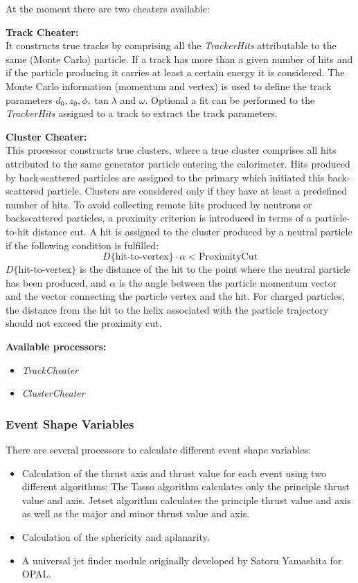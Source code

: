 At the moment there are two cheaters available:

{\bf Track Cheater:} \\
It constructs true tracks by comprising all the {\em TrackerHits} attributable
to the same (Monte Carlo) particle. If a track has more than a given number of
hits and if the particle producing it carries at least a certain 
energy it is considered. The Monte Carlo information 
(momentum and vertex) is used to define the track parameters
$d_0, z_0, \phi, \tan\lambda$ and $\omega$.
Optional a fit can be performed to the {\em TrackerHits} assigned to a track
to extract the track parameters. 

{\bf Cluster Cheater:} \\
This processor constructs true clusters, where a true cluster comprises all 
hits attributed to the same generator particle entering 
the calorimeter. Hits produced by back-scattered particles are assigned to the 
primary which initiated this back-scattered particle. 
Clusters are considered only if they have at least a predefined number of 
hits. 
To avoid collecting remote hits produced by neutrons or backscattered 
particles, a proximity criterion is introduced in terms 
of a particle-to-hit distance cut. A hit is assigned to the cluster 
produced by a neutral particle if 
the following condition is fulfilled: 
$$
D\{\textrm{hit-to-vertex}\} \cdot \alpha < \textrm{ProximityCut}
$$
$D\{$hit-to-vertex$\}$ is the distance of the hit to the point 
where the neutral particle has been produced, and $\alpha$ is the 
angle between the particle momentum vector and the vector connecting 
the particle vertex and the hit. 
For charged particles, the distance from the hit to 
the helix associated with the particle trajectory should
not exceed the proximity cut. 

{\bf Available processors:} 
\begin{itemize}
\item {\em TrackCheater}
\item {\em ClusterCheater}
\end{itemize}

\subsubsection{Event Shape Variables}

There are several processors to calculate different event shape variables:

\begin{itemize}
\item Calculation of the thrust axis and thrust value for each event using two
      different algorithms:
      The Tasso algorithm calculates only the principle thrust value and axis.
      Jetset algorithm calculates the principle thrust value and axis
      as well as the major and minor thrust value and axis.   
\item Calculation of the sphericity and aplanarity. 
\item A universal jet finder module originally developed by Satoru Yamashita for
   OPAL.
\end{itemize}

